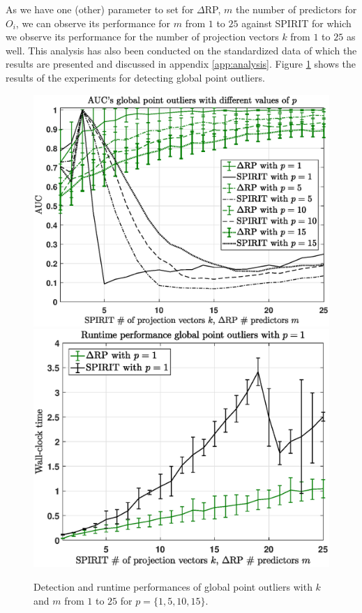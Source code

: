As we have one (other) parameter to set for $\Delta$RP, $m$ the number of predictors for $O_i$, we can observe its performance for $m$ from $1$ to $25$ against SPIRIT for which we observe its performance for the number of projection vectors $k$ from $1$ to $25$ as well. This analysis has also been conducted on the standardized data of which the results are presented and discussed in appendix \ref{app:analysis}. Figure \ref{fig:analysis_aucs_global_spiritdelta} shows the results of the experiments for detecting global point outliers.

\begin{figure}[h]
	\centering
	\vspace{0.15cm}
	\includegraphics[scale=0.36]{analysis/AUCs_point_spiritdelta}
	\includegraphics[scale=0.38]{analysis/Runtimes_point_spiritdelta}
	\caption{Detection and runtime performances of global point outliers with $k$ and $m$ from $1$ to $25$ for $p=\{1,5,10,15\}$.}
	\label{fig:analysis_aucs_global_spiritdelta}
	\vspace{-0.1cm}
\end{figure}

